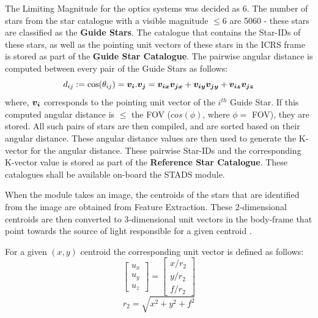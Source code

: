 \documentclass[../../main.tex]{subfiles}
\begin{document}
The Limiting Magnitude for the optics systems was decided as 6. The number of stars from the star catalogue with a visible magnitude $\le 6$ are 5060 - these stars are classified as the \textbf{Guide Stars}. The catalogue that contains the Star-IDs of these stars, as well as the pointing unit vectors of these stars in the ICRS frame is stored as part of the \textbf{Guide Star Catalogue}.
The pairwise angular distance is computed between every pair of the Guide Stars as follows:
\begin{equation}
    d_{ij} := \cos(\theta_{ij}) = \boldsymbol{v_i}.\boldsymbol{v_j} = \boldsymbol{v_{ix}}\boldsymbol{v_{jx}} + \boldsymbol{v_{iy}}\boldsymbol{v_{jy}} + \boldsymbol{v_{iz}}\boldsymbol{v_{jz}}
    \label{eq:ST_AngDst}
\end{equation}
where, $\boldsymbol{v_i}$ corresponds to the pointing unit vector of the $i^{th}$ Guide Star.
If this computed angular distance is $\le$ the FOV ($cos(\phi)$, where $\phi=$ FOV), they are stored.
All such pairs of stars are then compiled, and are sorted based on their angular distance. These angular distance values are then used to generate the K-vector for the angular distance. These pairwise Star-IDs and the corresponding K-vector value is stored as part of the \textbf{Reference Star Catalogue}. These catalogues shall be available on-board the STADS module.

 
When the module takes an image, the centroids of the stars that are identified from the image are obtained from Feature Extraction. These 2-dimensional centroids are then converted to 3-dimensional unit vectors in the body-frame that point towards the source of light responsible for a given centroid \cite{erlank2013development}.

For a given $(x, y)$ centroid the corresponding unit vector is defined as follows:
\begin{equation}
    \begin{bmatrix} u_{x} \\ u_{y} \\ u_{z} \end{bmatrix} = \begin{bmatrix} x/r_{2} \\ y/r_{2} \\ f/r_{2} \end{bmatrix}
\end{equation}
\begin{equation}
    r_{2} = \sqrt{x^2 + y^2 + f^2}
\end{equation}
\end{document}
